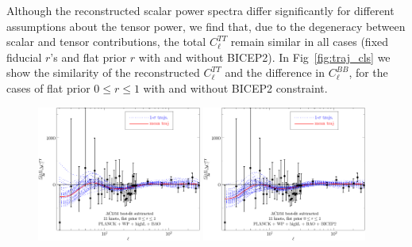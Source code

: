 \documentclass[a4paper,11pt]{article}
\def \halffigwidth{0.48\textwidth}
\begin{document}
Although the reconstructed scalar power spectra differ significantly for different assumptions about the tensor power, we find that, due to the degeneracy between scalar and tensor contributions, the total $C_\ell^{TT}$ remain similar in all cases (fixed fiducial $r$'s and flat prior $r$ with and without BICEP2). In Fig~\ref{fig:traj_cls} we show the similarity of the reconstructed $C_\ell^{TT}$ and the difference in $C_{\ell}^{BB}$, for the cases of flat prior $0\le r \le 1$ with and without BICEP2 constraint. 

\begin{figure}
\includegraphics[width = \halffigwidth]{nobicep_spline0_p11_dclTT_trajs.pdf}%
\includegraphics[width = \halffigwidth]{spline0_p11_dclTT_trajs.pdf}

\end{figure}
\end{document}
